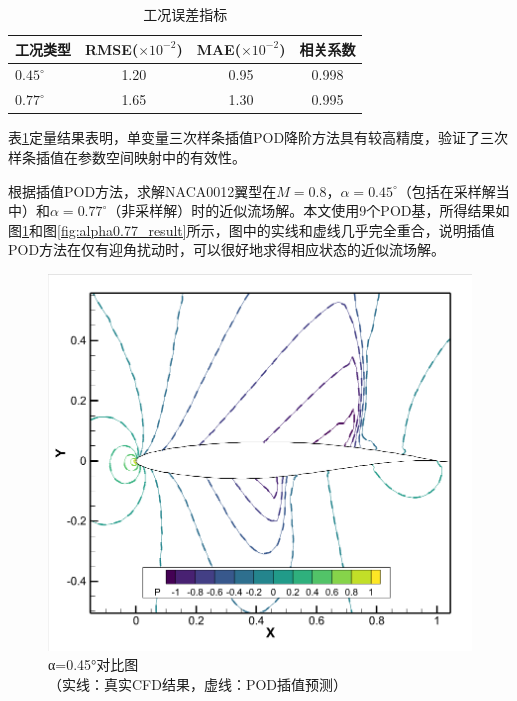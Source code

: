\begin{table}[H]
\centering
{} %
\caption{工况误差指标}
\label{tab:error}
\begin{tabular}{lccc}
\toprule
\rowcolor{gray!20} %
工况类型 & RMSE($\times10^{-2}$) & MAE($\times10^{-2}$) & 相关系数 \\
\midrule
$0.45^\circ$ & 1.20 & 0.95 & 0.998 \\
$0.77^\circ$ & 1.65 & 1.30 & 0.995 \\
\bottomrule
\end{tabular}
\end{table}
表\ref{tab:error}定量结果表明，单变量三次样条插值POD降阶方法具有较高精度，验证了三次样条插值在参数空间映射中的有效性。

根据插值POD方法，求解NACA0012翼型在$M=0.8$，$\alpha=0.45^\circ$（包括在采样解当中）和$\alpha=0.77^\circ$（非采样解）时的近似流场解。本文使用9个POD基，所得结果如图\ref{fig:alpha0.45_result}和图\ref{fig:alpha0.77_result}所示，图中的实线和虚线几乎完全重合，说明插值POD方法在仅有迎角扰动时，可以很好地求得相应状态的近似流场解。
\begin{figure}[H]
    \centering
    \includegraphics[width=0.7\linewidth]{0.45对比图.png}
    \caption{\songti α=0.45°对比图\\
{\songti\footnotesize （实线：真实CFD结果，虚线：POD插值预测）}}
    \label{fig:alpha0.45_result}
\end{figure}

